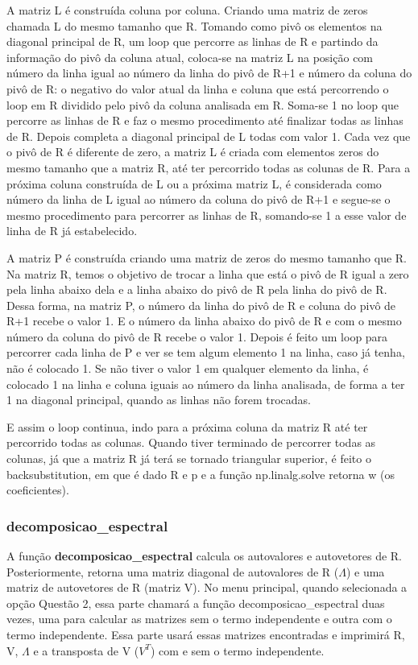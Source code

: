 \documentclass[a4paper,12pt,twoside]{article}
\begin{document}
A matriz L é construída coluna por coluna. Criando uma matriz de zeros chamada L do mesmo tamanho que R. Tomando como pivô os elementos na diagonal principal de R, um loop que percorre as linhas de R e partindo da informação do pivô da coluna atual, coloca-se na matriz L na posição com número da linha igual ao número da linha do pivô de R+1 e número da coluna do pivô de R: o negativo do valor atual da linha e coluna que está percorrendo o loop em R dividido pelo pivô da coluna analisada em R. Soma-se 1 no loop que percorre as linhas de R e faz o mesmo procedimento até finalizar todas as linhas de R. Depois completa a diagonal principal de L todas com valor 1. Cada vez que o pivô de R é diferente de zero, a matriz L é criada com elementos zeros do mesmo tamanho que a matriz R, até ter percorrido todas as colunas de R. Para a próxima coluna construída de L ou a próxima matriz L, é considerada como número da linha de L igual ao número da coluna do pivô de R+1 e segue-se o mesmo procedimento para percorrer as linhas de R, somando-se 1 a esse valor de linha de R já estabelecido.

A matriz P é construída criando uma matriz de zeros do mesmo tamanho que R. Na matriz R, temos o objetivo de trocar a linha que está o pivô de R igual a zero pela linha abaixo dela e a linha abaixo do pivô de R pela linha do pivô de R. Dessa forma, na matriz P, o número da linha do pivô de R e coluna do pivô de R+1 recebe o valor 1. E o número da linha abaixo do pivô de R e com o mesmo número da coluna do pivô de R recebe o valor 1. Depois é feito um loop para percorrer cada linha de P e ver se tem algum elemento 1 na linha, caso já tenha, não é colocado 1. Se não tiver o valor 1 em qualquer elemento da linha, é colocado 1 na linha e coluna iguais ao número da linha analisada, de forma a ter 1 na diagonal principal, quando as linhas não forem trocadas. 

E assim o loop continua, indo para a próxima coluna da matriz R até ter percorrido todas as colunas. Quando tiver terminado de percorrer todas as colunas, já que a matriz R já terá se tornado triangular superior, é feito o backsubstitution, em que é dado R e p e a função np.linalg.solve retorna w (os coeficientes). 

\subsubsection{decomposicao\_espectral}
   A função \textbf{decomposicao\_espectral} calcula os autovalores e autovetores de R. Posteriormente, retorna uma matriz diagonal de autovalores de R ($\Lambda$) e uma matriz de autovetores de R (matriz V). No menu principal, quando selecionada a opção Questão 2, essa parte chamará a função decomposicao\_espectral duas vezes, uma para calcular as matrizes sem o termo independente e outra com o termo independente. Essa parte usará essas matrizes encontradas e imprimirá R, V, $\Lambda$ e a transposta de V ($V^T$) com e sem o termo independente. 
\end{document}

